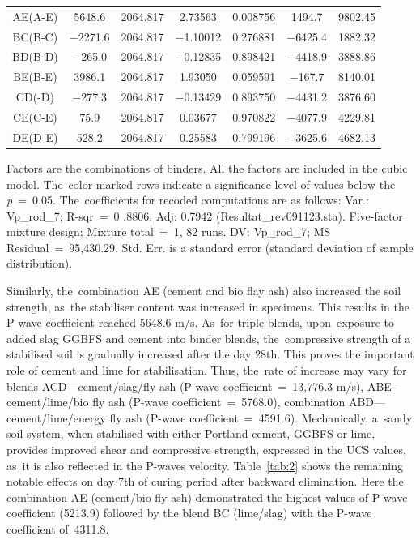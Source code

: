 \documentclass[materials,article,accept,pdftex,moreauthors]{Definitions/mdpi}
\begin{document}
\begin{table}[H]
\begin{tabularx}{\textwidth}{CCCCCCC}
           AE(A-E) & 5648.6 & 2064.817 & 2.73563 & 0.008756 & 1494.7 & 9802.45 \\  
        BC(B-C) & $-$2271.6 & 2064.817 & $-$1.10012 & 0.276881 & $-$6425.4 & 1882.32 \\ \midrule
        BD(B-D) & $-$265.0 & 2064.817 & $-$0.12835 & 0.898421 & $-$4418.9 & 3888.86 \\ \midrule
        BE(B-E) & 3986.1 & 2064.817 & 1.93050 & 0.059591 & $-$167.7 & 8140.01 \\ \midrule
        CD(-D) & $-$277.3 & 2064.817 & $-$0.13429 & 0.893750 & $-$4431.2 & 3876.60 \\ \midrule
        CE(C-E) & 75.9 & 2064.817 & 0.03677 & 0.970822 & $-$4077.9 & 4229.81 \\ \midrule
        DE(D-E) & 528.2 & 2064.817 & 0.25583 & 0.799196 & $-$3625.6 & 4682.13 \\ \bottomrule
\end{tabularx}
\footnotesize{Factors %
 are the combinations of binders. All the factors are included in the cubic model. The~color-marked rows indicate a significance level of values below the \emph{p}~=~0.05. The~coefficients for recoded computations are as follows: Var.: Vp\_rod\_7; R-sqr~=~0%
.8806; Adj: 0.7942 (Resultat\_rev091123.sta). Five-factor mixture design; Mixture total~=~1, %
 82 runs. DV: Vp\_rod\_7; MS Residual~=~95,430.29. Std. Err. is a standard error (standard deviation of sample distribution).}
\end{table}
 
Similarly, the~combination AE (cement and bio flay ash) also increased the soil strength, as~the stabiliser content was increased in specimens. This results in the P-wave coefficient reached 5648.6 m/s. As~for triple blends, upon~exposure to added slag GGBFS and cement into binder blends, the~compressive strength of a stabilised soil is gradually increased after the day 28th. This proves the important role of cement and lime for stabilisation. Thus, the~rate of increase may vary for blends ACD---cement/slag/fly ash (P-wave coefficient~=~13,776.3 m/s), ABE--cement/lime/bio fly ash (P-wave coefficient~=~5768.0), combination ABD---cement/lime/energy fly ash (P-wave coefficient~=~4591.6). Mechanically, a~sandy soil system, when stabilised with either Portland cement, GGBFS or lime, provides improved shear and compressive strength, expressed in the UCS values, as~it is also reflected in the P-waves velocity. Table~\ref{tab:2} shows the remaining notable effects on day 7th of curing period after backward elimination. Here the combination AE (cement/bio fly ash) demonstrated the highest values of P-wave coefficient (5213.9) followed by the blend BC (lime/slag) with the P-wave coefficient of~4311.8.
\end{document}
